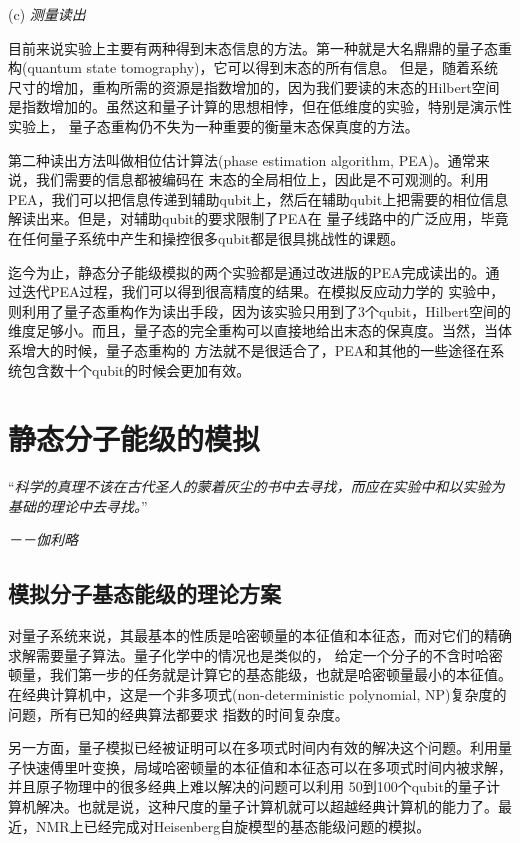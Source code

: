 (c) \emph{ 测量读出}

目前来说实验上主要有两种得到末态信息的方法。第一种就是大名鼎鼎的量子态重构(quantum state tomography)，它可以得到末态的所有信息。
但是，随着系统尺寸的增加，重构所需的资源是指数增加的，因为我们要读的末态的Hilbert空间是指数增加的。虽然这和量子计算的思想相悖，但在低维度的实验，特别是演示性实验上，
量子态重构仍不失为一种重要的衡量末态保真度的方法。

第二种读出方法叫做相位估计算法(phase estimation algorithm, PEA)\cite{lq7,qschem22,qschem23,qschem24}。通常来说，我们需要的信息都被编码在
末态的全局相位上，因此是不可观测的。利用PEA，我们可以把信息传递到辅助qubit上，然后在辅助qubit上把需要的相位信息解读出来。但是，对辅助qubit的要求限制了PEA在
量子线路中的广泛应用，毕竟在任何量子系统中产生和操控很多qubit都是很具挑战性的课题。

迄今为止，静态分子能级模拟的两个实验都是通过改进版的PEA完成读出的\cite{optics_static,static}。通过迭代PEA过程，我们可以得到很高精度的结果。在模拟反应动力学的
实验中\cite{dynamical}，则利用了量子态重构作为读出手段，因为该实验只用到了3个qubit，Hilbert空间的维度足够小。而且，量子态的完全重构可以直接地给出末态的保真度。当然，当体系增大的时候，量子态重构的
方法就不是很适合了，PEA和其他的一些途径\cite{qschem25,qschem26,qschem27,ini2}在系统包含数十个qubit的时候会更加有效。

\section{静态分子能级的模拟}

“\emph{科学的真理不该在古代圣人的蒙着灰尘的书中去寻找，而应在实验中和以实验为基础的理论中去寻找。}”

 \hspace{23em} \emph{－－伽利略}

\subsection{模拟分子基态能级的理论方案}

对量子系统来说，其最基本的性质是哈密顿量的本征值和本征态，而对它们的精确求解需要量子算法\cite{lq7}。量子化学中的情况也是类似的，
给定一个分子的不含时哈密顿量，我们第一步的任务就是计算它的基态能级，也就是哈密顿量最小的本征值。在经典计算机中，这是一个非多项式(non-deterministic polynomial, NP)复杂度的问题，所有已知的经典算法都要求
指数的时间复杂度。

另一方面，量子模拟已经被证明可以在多项式时间内有效的解决这个问题\cite{lq7}。利用量子快速傅里叶变换，局域哈密顿量的本征值和本征态可以在多项式时间内被求解，并且原子物理中的很多经典上难以解决的问题可以利用
50到100个qubit的量子计算机解决\cite{lq7}。也就是说，这种尺度的量子计算机就可以超越经典计算机的能力了。最近，NMR上已经完成对Heisenberg自旋模型的基态能级问题的模拟\cite{yexiao}。

